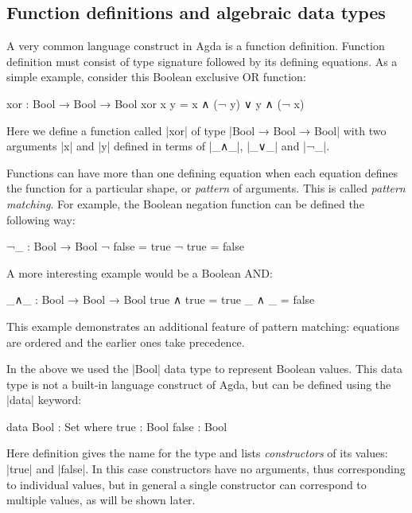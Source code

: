 \subsection{Function definitions and algebraic data types}

A very common language construct in Agda is a function definition. Function definition must consist of type signature followed by its defining equations. As a simple example, consider this Boolean exclusive OR function:

\begin{code}
xor : Bool → Bool → Bool
xor x y = x ∧ (¬ y) ∨ y ∧ (¬ x)
\end{code}

Here we define a function called |xor| of type |Bool → Bool → Bool| with two arguments |x| and |y| defined in terms of |_∧_|, |_∨_| and |¬_|.

Functions can have more than one defining equation when each equation defines the function for a particular shape, or \emph{pattern} of arguments. This is called \emph{pattern matching}.
For example, the Boolean negation function can be defined the following way:

\begin{code}
¬_ : Bool → Bool
¬ false = true
¬ true = false
\end{code}

A more interesting example would be a Boolean AND:

\begin{code}
_∧_ : Bool → Bool → Bool
true ∧ true = true
_ ∧ _ = false
\end{code}

This example demonstrates an additional feature of pattern matching: equations are ordered and the earlier ones take precedence.

In the above we used the |Bool| data type to represent Boolean values. This data type is not a built-in language construct of Agda, but can be defined using the |data| keyword:

\begin{code}
data Bool : Set where
  true : Bool
  false : Bool
\end{code}

Here definition gives the name for the type and lists \emph{constructors} of its values: |true| and |false|. In this case constructors have no arguments, thus corresponding to individual values, but in general a single constructor can correspond to multiple values, as will be shown later.

